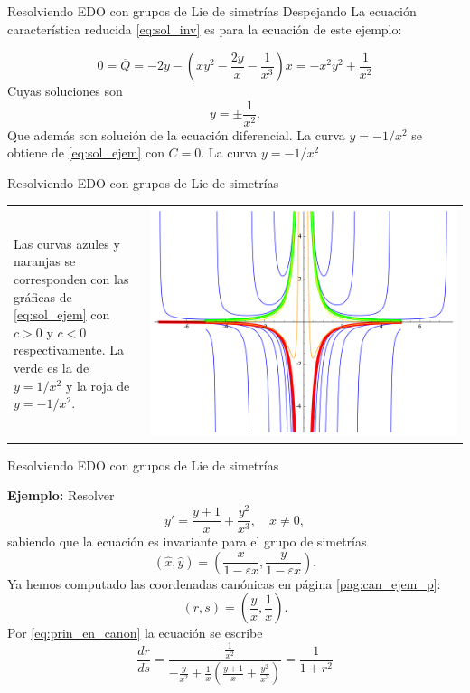 \documentclass[handout,hyperref={colorlinks=true}]{beamer}
\renewcommand{\epsilon}{\varepsilon}
\begin{document}
\begin{frame}{Resolviendo EDO con grupos de Lie de simetrías}
Despejando
La ecuación característica reducida \eqref{eq:sol_inv} es para la ecuación de este ejemplo:

\[0=\overline{Q}=-2y- \left(xy^2-\frac{2y}{x}-\frac{1}{x^3}  \right)x=-x^2y^2+\frac{1}{x^2}\]
Cuyas soluciones son
\[y=\pm\frac{1}{x^2}.\]
Que además son solución de la ecuación diferencial. La curva $y=-1/x^2$ se obtiene de \eqref{eq:sol_ejem} con $C=0$. La  curva $y=-1/x^2$

\end{frame}


\begin{frame}{Resolviendo EDO con grupos de Lie de simetrías}

\begin{tabular}{m{0.3\linewidth} >{\centering\arraybackslash}m{0.7\linewidth} }
Las curvas azules y naranjas se corresponden con las gráficas de \eqref{eq:sol_ejem} con $c>0$ y $c<0$ respectivamente. La verde es la de $y=1/x^2$ y la roja de $y=-1/x^2$.
&
\includegraphics[scale=.4]{imagenes/SolGrup.png}
\end{tabular}
\end{frame}



\begin{frame}{Resolviendo EDO con grupos de Lie de simetrías}



\onslide<+->\textbf{Ejemplo:} Resolver 
\[y'=\frac{y+1}{x}+\frac{y^2}{x^3},\quad x\neq 0,\]
sabiendo que la ecuación es invariante para el grupo de simetrías
\[(\hat{x},\hat{y})=(\frac{x}{1-\epsilon x},\frac{y}{1-\epsilon x}   ).\]
Ya hemos computado las coordenadas canónicas en página \ref{pag:can_ejem_p}:
\[(r,s)=\left(\frac{y}{x},\frac{1}{x}\right).\]
Por \eqref{eq:prin_en_canon} la ecuación se escribe
\[\frac{dr}{ds}=\frac{-\frac{1}{x^2} }{-\frac{y}{x^2}+\frac{1}{x}\left(
\frac{y+1}{x}+\frac{y^2}{x^3}\right)}=\frac{1}{1+r^2}\]

\end{frame}
\end{document}
